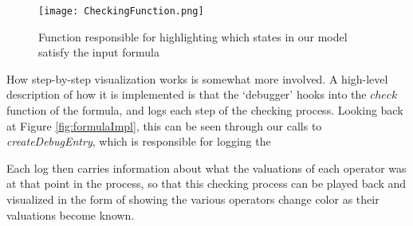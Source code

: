 \begin{figure}[h]
	\label{fig:CheckingFunction}
	\texttt{[image: CheckingFunction.png]}
	\caption{Function responsible for highlighting which states in our model satisfy the input formula}
\end{figure}

How step-by-step visualization works is somewhat more involved. A high-level description of how it is implemented is that the `debugger' hooks into the $check$ function of the formula, and logs each step of the checking process. Looking back at Figure \ref{fig:formulaImpl}, this can be seen through our calls to \textit{createDebugEntry}, which is responsible for logging the 

 Each log then carries information about what the valuations of each operator was at that point in the process, so that this checking process can be played back and visualized in the form of showing the various operators change color as their valuations become known. 
 












